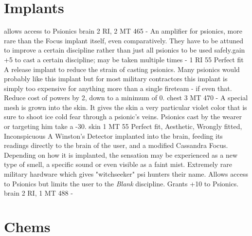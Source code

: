 \documentclass[12pt,a4paper,openany,usenames,dvipsnames]{book}
\begin{document}
	\section{Implants}
	\vspace{4mm}
	\begin{multicols}{2}
        {allows access to Psionics}
        {brain}
        {2 RI, 2 MT}
        {465}
        {-}
        {An amplifier for psionics, more rare than the Focus implant itself, even comparatively. They have to be attuned to improve a certain discipline rather than just all psionics to be used safely.}{gain +5 to cast a certain discipline; may be taken multiple times}
        {-}
        {1 RI}
        {55}
        {Perfect fit}
        {A release implant to reduce the strain of casting psionics. Many psionics would probably like this implant but for most military contractors this implant is simply too expensive for anything more than a single fireteam - if even that.}
        {Reduce cost of powers by 2, down to a minimum of 0.}
        {chest}
        {3 MT}
        {470}
        {-}
        {A special mesh is grown into the skin. It gives the skin a very particular violet color that is sure to shoot ice cold fear through a psionic's veins.}
        {Psionics cast by the wearer or targeting him take a -30.}
        {skin}
        {1 MT}
        {55}
        {Perfect fit, Aesthetic, Wrongly fitted, Inconspicuous}
        {A Winston's Detector implanted into the brain, feeding its readings directly to the brain of the user, and a modified Cassandra Focus. Depending on how it is implanted, the sensation may be experienced as a new type of smell, a specific sound or even visible as a faint mist. Extremely rare military hardware which gives "witchseeker" psi hunters their name.}
        {
        	Allows access to Psionics
        	but limits the user to the \emph{Blank} discipline.
        	Grants +10 to Psionics.
        }
        {brain}
        {2 RI, 1 MT}
        {488}
        {-}
	\end{multicols}
	
	\pagebreak%
	\section{Chems}
	\vspace{4mm}
	\begin{multicols}{2}
	\end{multicols}
\end{document}
